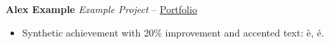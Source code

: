 \documentclass[9pt,a4paper]{extarticle}
\begin{document}
\textbf{Alex Example} \textit{Example Project} -- \href{https://example.test}{Portfolio}
\begin{itemize}
\item Synthetic achievement with 20\% improvement and accented text: \`e, \'e.
\end{itemize}
\end{document}
